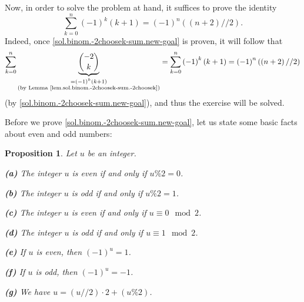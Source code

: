 \documentclass[paper=a4, fontsize=12pt]{scrartcl}%
\let\sumnonlimits\sum
\renewcommand{\sum}{\sumnonlimits\limits}
\theoremstyle{plainsl}
\newtheorem{proposition}[theorem]{Proposition}
\theoremstyle{definition}
\theoremstyle{remark}
\begin{document}

Now, in order to solve the problem at hand, it suffices to prove the identity%
\begin{equation}
\sum_{k=0}^{n}\left(  -1\right)  ^{k}\left(  k+1\right)  =\left(  -1\right)
^{n}\left(  \left(  n+2\right)  //2\right)  .
\label{sol.binom.-2choosek-sum.new-goal}%
\end{equation}
Indeed, once \eqref{sol.binom.-2choosek-sum.new-goal} is proven, it will
follow that%
\[
\sum_{k=0}^{n}\underbrace{\dbinom{-2}{k}}_{\substack{=\left(  -1\right)
^{k}\left(  k+1\right)  \\\text{(by Lemma
\ref{lem.sol.binom.-2choosek-sum.-2choosek})}}}=\sum_{k=0}^{n}\left(
-1\right)  ^{k}\left(  k+1\right)  =\left(  -1\right)  ^{n}\left(  \left(
n+2\right)  //2\right)
\]
(by \eqref{sol.binom.-2choosek-sum.new-goal}), and thus the exercise will be solved.

Before we prove \eqref{sol.binom.-2choosek-sum.new-goal}, let us state some
basic facts about even and odd numbers:

\begin{proposition}
\label{prop.sol.binom.-2choosek-sum.evod}Let $u$ be an integer.

\textbf{(a)} The integer $u$ is even if and only if $u\%2=0$.

\textbf{(b)} The integer $u$ is odd if and only if $u\%2=1$.

\textbf{(c)} The integer $u$ is even if and only if $u\equiv0\mod 2$.

\textbf{(d)} The integer $u$ is odd if and only if $u\equiv1\mod 2$.

\textbf{(e)} If $u$ is even, then $\left(  -1\right)  ^{u}=1$.

\textbf{(f)} If $u$ is odd, then $\left(  -1\right)  ^{u}=-1$.

\textbf{(g)} We have $u=\left(  u//2\right)  \cdot2+\left(  u\%2\right)  $.
\end{proposition}
\end{document}

